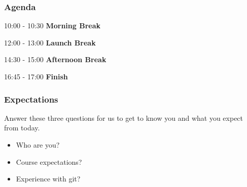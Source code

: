 \begin{frame}
    \frametitle{Agenda}
    \vspace{8em}

    \begin{description}
      \item 10:00 - 10:30 \textbf{Morning Break}
      \item 12:00 - 13:00 \textbf{Launch Break}
      \item 14:30 - 15:00 \textbf{Afternoon Break}
      \item 16:45 - 17:00 \textbf{Finish}
    \end{description}
  \end{frame}


\begin{frame}
    \frametitle{Expectations}
    Answer these three questions for us to get to know you and what you expect from today.
    \begin{itemize}
      \item Who are you?
      \item Course expectations?
      \item Experience with git?
    \end{itemize}
  \end{frame}
